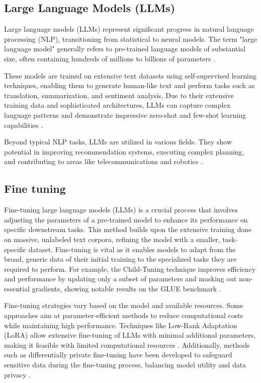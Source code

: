 \subsection*{Large Language Models (LLMs)}

Large language models (LLMs) represent significant progress in natural language processing (NLP), transitioning from statistical to neural models. The term "large language model" generally refers to pre-trained language models of substantial size, often containing hundreds of millions to billions of parameters \cite{zhao2023survey}.

These models are trained on extensive text datasets using self-supervised learning techniques, enabling them to generate human-like text and perform tasks such as translation, summarization, and sentiment analysis. Due to their extensive training data and sophisticated architectures, LLMs can capture complex language patterns and demonstrate impressive zero-shot and few-shot learning capabilities \cite{naveed2024comprehensive}.

Beyond typical NLP tasks, LLMs are utilized in various fields. They show potential in improving recommendation systems, executing complex planning, and contributing to areas like telecommunications and robotics \cite{10305960} \cite{fan2023fatellm}.

\subsection*{Fine tuning}
Fine-tuning large language models (LLMs) is a crucial process that involves adjusting the parameters of a pre-trained model to enhance its performance on specific downstream tasks. This method builds upon the extensive training done on massive, unlabeled text corpora, refining the model with a smaller, task-specific dataset. Fine-tuning is vital as it enables models to adapt from the broad, generic data of their initial training to the specialized tasks they are required to perform. For example, the Child-Tuning technique improves efficiency and performance by updating only a subset of parameters and masking out non-essential gradients, showing notable results on the GLUE benchmark \cite{xu-etal-2021-raise}.

Fine-tuning strategies vary based on the model and available resources. Some approaches aim at parameter-efficient methods to reduce computational costs while maintaining high performance. Techniques like Low-Rank Adaptation (LoRA) allow extensive fine-tuning of LLMs with minimal additional parameters, making it feasible with limited computational resources \cite{sun2023comparative}. Additionally, methods such as differentially private fine-tuning have been developed to safeguard sensitive data during the fine-tuning process, balancing model utility and data privacy \cite{yu2022differentially}.

